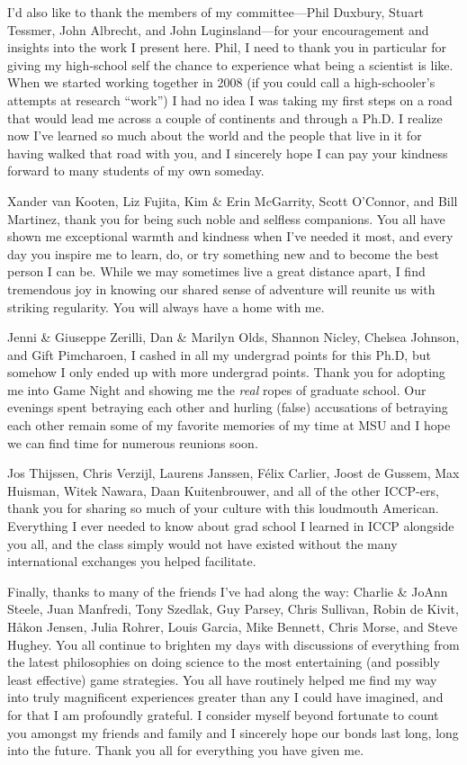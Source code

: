 \documentclass[mixedtoc]{msu-thesis-custom}
\begin{document}
I'd also like to thank the members of my committee---Phil Duxbury, Stuart
Tessmer, John Albrecht, and John Luginsland---for your encouragement and
insights into the work I present here. Phil, I need to thank you in particular
for giving my high-school self the chance to experience what being a scientist
is like. When we started working together in 2008 (if you could call a
high-schooler's attempts at research ``work'') I had no idea I was taking my
first steps on a road that would lead me across a couple of continents and
through a Ph.D. I realize now I've learned so much about the world and the
people that live in it for having walked that road with you, and I sincerely
hope I can pay your kindness forward to many students of my own someday.

Xander van Kooten, Liz Fujita, Kim \& Erin McGarrity, Scott O'Connor, and Bill
Martinez, thank you for being such noble and selfless companions. You all have
shown me exceptional warmth and kindness when I've needed it most, and every
day you inspire me to learn, do, or try something new and to become the best
person I can be. While we may sometimes live a great distance apart,
I find tremendous joy in knowing our shared sense of adventure will reunite us
with striking regularity. You will always have a home with me.

Jenni \& Giuseppe Zerilli, Dan \& Marilyn Olds, Shannon Nicley, Chelsea
Johnson, and Gift Pimcharoen, I cashed in all my undergrad points for this
Ph.D, but somehow I only ended up with more undergrad points. Thank you for
adopting me into Game Night and showing me the \emph{real} ropes of graduate
school. Our evenings spent betraying each other and hurling (false) accusations
of betraying each other remain some of my favorite memories of my time at MSU
and I hope we can find time for numerous reunions soon.

Jos Thijssen, Chris Verzijl, Laurens Janssen, F\'elix Carlier, Joost de Gussem,
Max Huisman, Witek Nawara, Daan Kuitenbrouwer, and all of the other ICCP-ers,
thank you for sharing so much of your culture with this loudmouth American.
Everything I ever needed to know about grad school I learned in ICCP alongside
you all, and the class simply would not have existed without the many 
international exchanges you helped facilitate.

Finally, thanks to many of the friends I've had along the way: Charlie \& JoAnn
Steele, Juan Manfredi, Tony Szedlak, Guy Parsey, Chris Sullivan, Robin de
Kivit, H\aa kon Jensen, Julia Rohrer, Louis Garcia, Mike Bennett, Chris Morse,
and Steve Hughey. You all continue to brighten my days with discussions of
everything from the latest philosophies on doing science to the most
entertaining (and possibly least effective) game strategies. 
\newpage
You all have routinely helped me find my way into truly magnificent experiences
greater than any I could have imagined, and for that I am profoundly grateful. I
consider myself beyond fortunate to count you amongst my friends and family and
I sincerely hope our bonds last long, long into the future. Thank you all for
everything you have given me.
\end{document}
